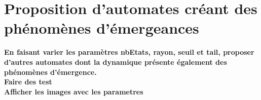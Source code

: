 \documentclass[12pt, a4paper]{article}
\begin{document}
    
    \section{Proposition d'automates créant des phénomènes d'émergeances}
        \textbf{En faisant varier les paramètres nbEtats, rayon, seuil et tail, proposer d'autres automates dont la dynamique présente également des phénomènes d'émergence.\\
        \Huge{Faire des test\\
        Afficher les images avec les parametres\\}}
    
\end{document}
